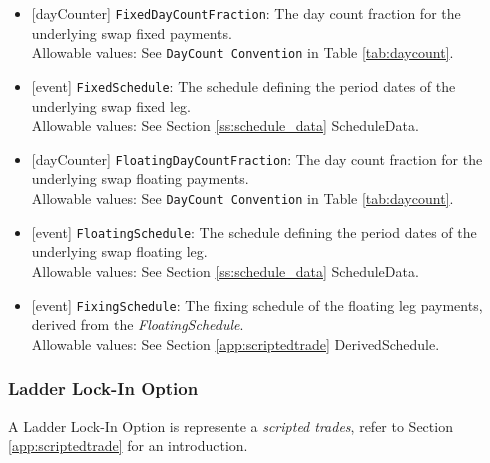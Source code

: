 \begin{itemize}
  \item{}[dayCounter] \lstinline!FixedDayCountFraction!: The day count fraction for the underlying swap fixed payments. \\
  Allowable values: See \lstinline!DayCount Convention! in Table \ref{tab:daycount}.
  \item{}[event] \lstinline!FixedSchedule!: The schedule defining the period dates of the underlying swap fixed leg. \\
  Allowable values: See Section \ref{ss:schedule_data} ScheduleData.
  \item{}[dayCounter] \lstinline!FloatingDayCountFraction!: The day count fraction for the underlying swap floating payments. \\
  Allowable values: See \lstinline!DayCount Convention! in Table \ref{tab:daycount}.
  \item{}[event] \lstinline!FloatingSchedule!: The schedule defining the period dates of the underlying swap floating leg. \\
  Allowable values: See Section \ref{ss:schedule_data} ScheduleData.
  \item{}[event] \lstinline!FixingSchedule!: The fixing schedule of the floating leg payments, derived from the \emph{FloatingSchedule}. \\
  Allowable values: See Section \ref{app:scriptedtrade} DerivedSchedule.
\end{itemize}

\subsubsection{Ladder Lock-In Option}
 

A Ladder Lock-In Option is represente a {\em scripted trades}, refer to Section
\ref{app:scriptedtrade} for an introduction.
 

